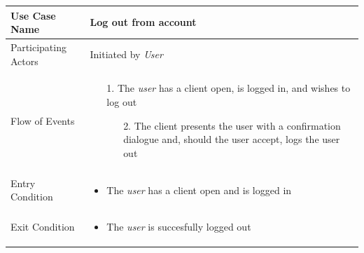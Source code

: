 \begin{center}
	\begin{tabular}{ | l | p{10cm} |  }
		 \hline
		Use Case Name & Log out from account \\ \hline
		Participating Actors & Initiated by \emph{User} \\ \hline
		Flow of Events & \begin{enumerate}
						\item[1.] The \emph{user} has a client open, is logged in, and wishes to log out
						\begin{enumerate}
							\item[2.] The client presents the user with a confirmation dialogue and, should the user accept, logs the user out
						\end{enumerate}
					\end{enumerate} \\ \hline
		Entry Condition & \begin{itemize}
						\item The \emph{user} has a client open and is logged in
					\end{itemize} \\ \hline
		Exit Condition & \begin{itemize}
						\item The \emph{user} is succesfully logged out
					\end{itemize} \\
		\hline
	\end{tabular}
\end{center}

